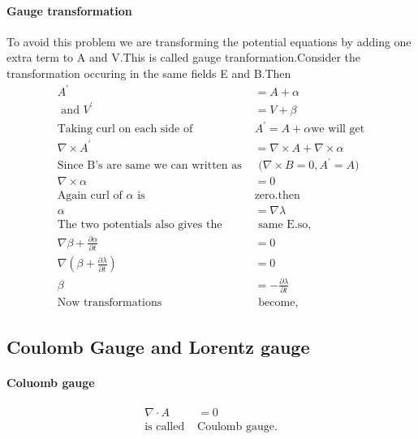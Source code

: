 \paragraph{Gauge transformation}
To avoid this problem we are transforming the potential equations by adding one extra term to A and V.This is called gauge tranformation.Consider the transformation occuring in the same fields E and B.Then
\begin{align*}
A^{\prime}&=A+\alpha\\
\text{ and }
V^{\prime}&=V+\beta\\
\text{Taking curl on each side of } &\text{$A^{\prime}=A+\alpha$
	we will get}\\
\nabla \times A^{\prime}&=\nabla \times A+\nabla \times \alpha\\
\text{Since B's are same we can written as }&\text{ ($\nabla \times B=0,A^{\prime}=A$)} \\
\nabla \times \alpha &=0\\
\text{Again curl of $\alpha$ is }&\text{zero.then}\\
\alpha&=\nabla \lambda\\
\text{The two potentials also gives the}&\text{ same E.so,}\\
\nabla \beta +\frac{\partial \alpha }{\partial t}&=0\\
\nabla\left( \beta+\frac{\partial \lambda}{\partial t}\right) &=0\\
\beta&= -\frac{\partial \lambda}{\partial t}\\
\text{Now transformations}&\text{ become,}
\end{align*}
\begin{center}
\end{center}
\subsection{Coulomb Gauge and Lorentz gauge}
\paragraph{Coluomb gauge}
\begin{align*}
\nabla \cdot A&=0\\
\text{is called }&\text{Coulomb gauge.}\\
\end{align*}
